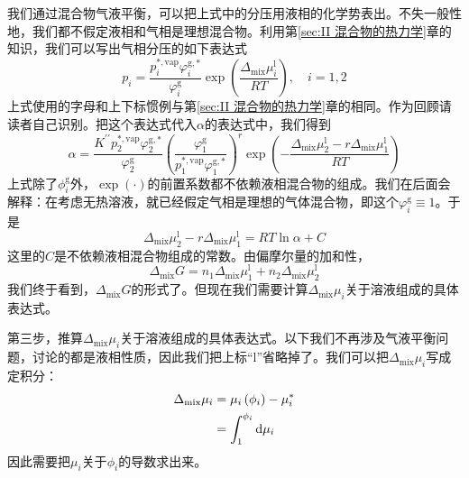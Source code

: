 \documentclass[main.tex]{subfiles}
\begin{document}
我们通过混合物气液平衡，可以把上式中的分压用液相的化学势表出。不失一般性地，我们都不假定液相和气相是理想混合物。利用第\ref{sec:II 混合物的热力学}章的知识，我们可以写出气相分压的如下表达式
\[p_i=\frac{p_i^{*,\text{vap}}\varphi_i^{\text{g},*}}{\varphi_i^\text{g}}\exp\left(\frac{\Delta_\text{mix}\mu_i^\text{l}}{RT}\right),\quad i=1,2\]
上式使用的字母和上下标惯例与第\ref{sec:II 混合物的热力学}章的相同。作为回顾请读者自己识别。把这个表达式代入$\alpha$的表达式中，我们得到
\[\alpha=\frac{K^{\prime\prime}p_2^{*,\text{vap}}\varphi_2^{\text{g},*}}{\varphi_2^\text{g}}\left(\frac{\varphi_1^\text{g}}{p_1^{*,\text{vap}}\varphi_1^{\text{g},*}}\right)^r\exp\left(-\frac{\Delta_\text{mix}\mu_2^\text{l}-r\Delta_\text{mix}\mu_1^\text{l}}{RT}\right)\]
上式除了$\phi_i^\text{g}$外，$\exp\left(\cdot\right)$的前置系数都不依赖液相混合物的组成。我们在后面会解释：在考虑无热溶液，就已经假定气相是理想的气体混合物，即这个$\varphi_i^\text{g}\equiv 1$。于是
\begin{equation}\label{eq:III.3 alpha_mu_relation}\Delta_\text{mix}\mu_2^\text{l}-r\Delta_\text{mix}\mu_1^\text{l}=RT\ln\alpha+C\end{equation}
这里的$C$是不依赖液相混合物组成的常数。由偏摩尔量的加和性，
\[\Delta_\text{mix} G=n_1\Delta_\text{mix}\mu_1^\text{l}+n_2\Delta_\text{mix}\mu_2^\text{l}\]
我们终于看到，$\Delta_\text{mix} G$的形式了。但现在我们需要计算$\Delta_\text{mix}\mu_i$关于溶液组成的具体表达式。

第三步，推算$\Delta_\text{mix}\mu_i$关于溶液组成的具体表达式。以下我们不再涉及气液平衡问题，讨论的都是液相性质，因此我们把上标“l”省略掉了。我们可以把$\Delta_\text{mix}\mu_i$写成定积分：
\begin{align}
  \Delta_\text{mix}\mu_i & = \mu_i\left(\phi_i\right) - \mu_i^*                             \notag \\
                         & = \int_1^{\phi_i}\mathrm{d}\mu_i\label{eq:III.3 delta_mix_mu_integral}
\end{align}
因此需要把$\mu_i$关于$\phi_i$的导数求出来。
\end{document}
